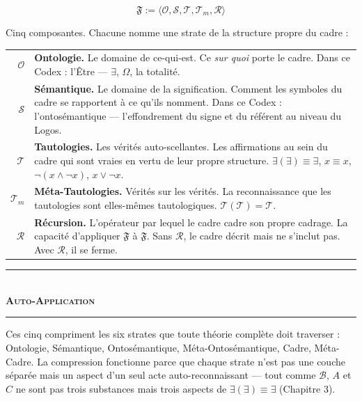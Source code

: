 \documentclass[10pt, openany, oneside]{book}
\renewcommand{\normalsize}{\fontsize{10}{13}\selectfont}
\renewcommand{\footnotesize}{\fontsize{8.5}{11}\selectfont}
\begin{document}
$$\mathfrak{F} := \langle \mathcal{O}, \mathcal{S}, \mathcal{T}, \mathcal{T}_m, \mathcal{R} \rangle$$

Cinq composantes. Chacune nomme une strate de la structure propre du cadre :

\vspace{0.5em}

{\footnotesize
\noindent\begin{tabular}{r p{}}
$\mathcal{O}$ & \textbf{Ontologie.} Le domaine de ce-qui-est. Ce \textit{sur quoi} porte le cadre. Dans ce Codex : l'Être --- $\exists$, $\Omega$, la totalité. \\[0.3em]
$\mathcal{S}$ & \textbf{Sémantique.} Le domaine de la signification. Comment les symboles du cadre se rapportent à ce qu'ils nomment. Dans ce Codex : l'ontosémantique --- l'effondrement du signe et du référent au niveau du Logos. \\[0.3em]
$\mathcal{T}$ & \textbf{Tautologies.} Les vérités auto-scellantes. Les affirmations au sein du cadre qui sont vraies en vertu de leur propre structure. $\exists(\exists) \equiv \exists$, $x \equiv x$, $\neg(x \wedge \neg x)$, $x \vee \neg x$. \\[0.3em]
$\mathcal{T}_m$ & \textbf{Méta-Tautologies.} Vérités sur les vérités. La reconnaissance que les tautologies sont elles-mêmes tautologiques. $\mathcal{T}(\mathcal{T}) = \mathcal{T}$. \\[0.3em]
$\mathcal{R}$ & \textbf{Récursion.} L'opérateur par lequel le cadre cadre son propre cadrage. La capacité d'appliquer $\mathfrak{F}$ à $\mathfrak{F}$. Sans $\mathcal{R}$, le cadre décrit mais ne s'inclut pas. Avec $\mathcal{R}$, il se ferme. \\[0.3em]
\end{tabular}
}

\vspace{1.5em}


\begin{center}
    \rule{0.3\textwidth}{0.4pt}\\[0.5em]
    {\normalsize\bfseries\scshape Auto-Application}\\[0.3em]
    \rule{0.3\textwidth}{0.4pt}
\end{center}

\vspace{1em}

\noindent Ces cinq compriment les six strates que toute théorie complète doit traverser : Ontologie, Sémantique, Ontosémantique, Méta-Ontosémantique, Cadre, Méta-Cadre. La compression fonctionne parce que chaque strate n'est pas une couche séparée mais un aspect d'un seul acte auto-reconnaissant --- tout comme $\mathcal{B}$, $A$ et $C$ ne sont pas trois substances mais trois aspects de $\exists(\exists) \equiv \exists$ (Chapitre 3).
\end{document}
